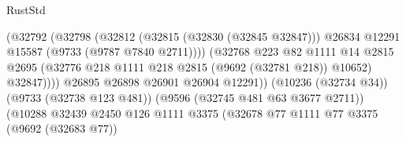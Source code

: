 \begin{lexlean}{RustStd}
\begin{coremodule}
{\begin{coremodule}
{{{{{{{{{{{{{{{{{{{{{{{{{{{{{{{{{{{{{{{{{{{{{{{{{{{{{{{                                                    (@32792
                                                      (@32798
                                                        (@32812
                                                          (@32815 (@32830 (@32845 @32847)))
                                                          @26834
                                                          @12291
                                                          @15587
                                                          (@9733 (@9787 @7840 @2711))))
                                                      (@32768
                                                        @223
                                                        @82
                                                        @1111
                                                        @14
                                                        @2815
                                                        @2695
                                                        (@32776
                                                          @218
                                                          @1111
                                                          @218
                                                          @2815
                                                          (@9692 (@32781 @218))
                                                          @10652)
                                                        @32847))))
                                                @26895
                                                @26898
                                                @26901
                                                @26904
                                                @12291))
                                            (@10236 (@32734 @34))
                                            (@9733 (@32738 @123 @481))
                                            (@9596 (@32745 @481 @63 @3677 @2711))
                                            (@10288
                                              @32439
                                              @2450
                                              @126
                                              @1111
                                              @3375
                                              (@32678
                                                @77
                                                @1111
                                                @77
                                                @3375
                                                (@9692 (@32683 @77))
}}}}}}}}}}}}}}}}}}}}}}}}}}}}}}}}}}}}}}}}}}}}}}}}}}}}}}}
\end{coremodule}}
\end{coremodule}
\end{lexlean}
